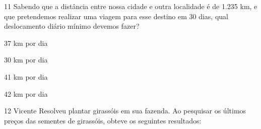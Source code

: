








\num{11} Sabendo que a distância entre nossa cidade e outra localidade é de
1.235 km, e que pretendemos realizar uma viagem para esse destino em 30
dias, qual deslocamento diário mínimo devemos fazer?

\begin{escolha}
\item 37 km por dia
\item 30 km por dia
\item 41 km por dia
\item 42 km por dia
\end{escolha}







\num{12} Vicente Resolveu plantar girassóis em sua fazenda. Ao pesquisar os
últimos preços das sementes de girassóis, obteve os seguintes
resultados:

